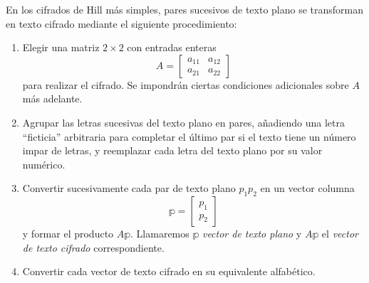 En los cifrados de Hill más simples, pares sucesivos de texto plano se transforman en texto cifrado mediante el siguiente procedimiento:
\begin{enumerate}[label=Paso~\arabic*., leftmargin=1.4cm]
    \item Elegir una matriz $2 \times 2$ con entradas enteras
    $$A = \begin{bmatrix}
        a_{11} & a_{12} \\
        a_{21} & a_{22}
    \end{bmatrix}$$
    para realizar el cifrado. Se impondrán ciertas condiciones adicionales sobre $A$ más adelante.
    \item Agrupar las letras sucesivas del texto plano en pares, añadiendo una letra “ficticia” arbitraria para completar el último par si el texto tiene un número impar de letras, y reemplazar cada letra del texto plano por su valor numérico.
    \item Convertir sucesivamente cada par de texto plano $p_1 p_2$ en un vector columna
    $$\mathbb{p} = \begin{bmatrix}
        p_1 \\
        p_2
    \end{bmatrix}$$
    y formar el producto $A\mathbb{p}$. Llamaremos $\mathbb{p}$ \emph{vector de texto plano} y $A\mathbb{p}$ el \emph{vector de texto cifrado} correspondiente.
    \item Convertir cada vector de texto cifrado en su equivalente alfabético.
\end{enumerate}

